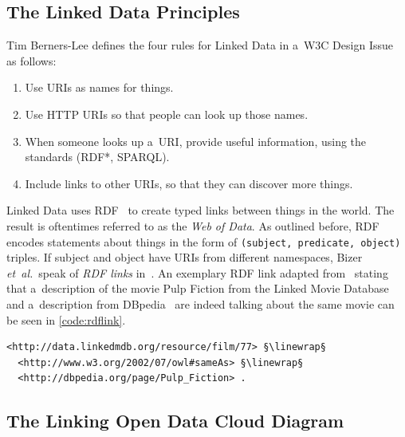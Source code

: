\subsection{The Linked Data Principles}
\label{sec:linked-data-principles}

Tim Berners-Lee defines the four rules for Linked Data in a~W3C Design Issue~\cite{bernerslee2006linkeddata} as follows:

\begin{enumerate}
  \item Use URIs as names for things.
  \item Use HTTP URIs so that people can look up those names.
  \item When someone looks up a~URI, provide useful information,
        using the standards (RDF*, SPARQL).
  \item Include links to other URIs,
        so that they can discover more things.
\end{enumerate}

Linked Data uses RDF~\cite{klyne2004rdf} to create
typed links between things in the world.
The result is oftentimes referred to as the \emph{Web of Data}.
As outlined before, RDF encodes statements
about things in the form of
\texttt{(subject, predicate, object)} triples.
If subject and object have URIs from different namespaces,
Bizer \emph{et~al.}\ speak of \emph{RDF links}
in~\cite{heath2011linkeddata}.
An exemplary RDF link adapted from~\cite{bizer2009linkeddatastory}
stating that a~description of the movie Pulp Fiction
from the Linked Movie Database~\cite{hassanzadeh2009linkedmovie}
and a~description from DBpedia~\cite{auer2007dbpedia}
are indeed talking about the same movie
can be seen in \autoref{code:rdflink}.

\begin{lstlisting}[caption={[Exemplary RDF link]{Exemplary RDF
  link stating that a~description of the movie Pulp Fiction from
  the Linked Movie Database~\cite{hassanzadeh2009linkedmovie}
  and a~description from DBpedia are indeed talking
  about the same movie}},
  label={code:rdflink},
  escapechar=§]
<http://data.linkedmdb.org/resource/film/77> §\linewrap§
  <http://www.w3.org/2002/07/owl#sameAs> §\linewrap§
  <http://dbpedia.org/page/Pulp_Fiction> .
\end{lstlisting}

\subsection{The Linking Open Data Cloud Diagram}
\label{sec:lodcloud}

